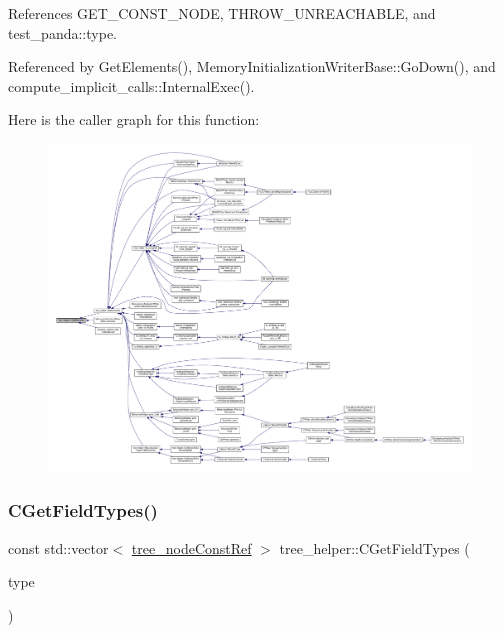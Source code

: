 References G\+E\+T\+\_\+\+C\+O\+N\+S\+T\+\_\+\+N\+O\+DE, T\+H\+R\+O\+W\+\_\+\+U\+N\+R\+E\+A\+C\+H\+A\+B\+LE, and test\+\_\+panda\+::type.



Referenced by Get\+Elements(), Memory\+Initialization\+Writer\+Base\+::\+Go\+Down(), and compute\+\_\+implicit\+\_\+calls\+::\+Internal\+Exec().

Here is the caller graph for this function\+:
\nopagebreak
\begin{figure}[H]
\begin{center}
\leavevmode
\includegraphics[width=350pt]{d7/d99/classtree__helper_a9119915404743215b4f3a6bb15718375_icgraph}
\end{center}
\end{figure}
\mbox{\label{classtree__helper_a0609784685642ee8a73ecbb32d5c3562}} 
\subsubsection{\texorpdfstring{C\+Get\+Field\+Types()}{CGetFieldTypes()}}
{\footnotesize\ttfamily const std\+::vector$<$ \hyperlink{tree__node_8hpp_a3cf5d02292c940f3892425a5b5fdec3c}{tree\+\_\+node\+Const\+Ref} $>$ tree\+\_\+helper\+::\+C\+Get\+Field\+Types (\begin{DoxyParamCaption}\item[{const \hyperlink{tree__node_8hpp_a3cf5d02292c940f3892425a5b5fdec3c}{tree\+\_\+node\+Const\+Ref}}]{type }\end{DoxyParamCaption})\hspace{0.3cm}{\ttfamily [static]}}




